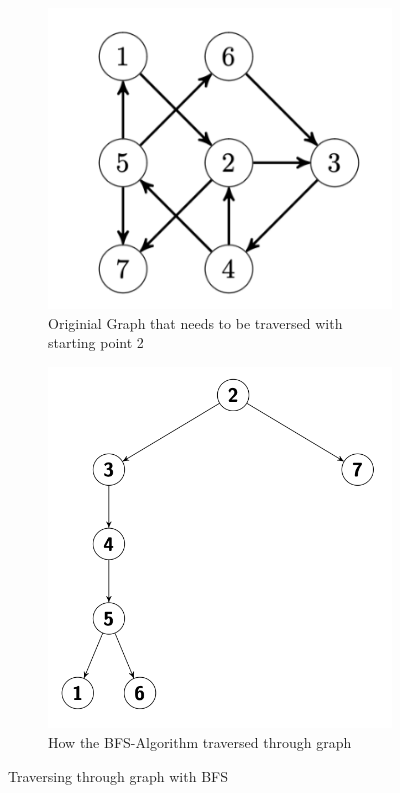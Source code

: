 \documentclass[a4paper]{article}
\begin{document}
    \begin{figure}[h]
    \begin{subfigure}{0.4\textwidth}
        \centering
        \includegraphics[scale = 0.4, width=\textwidth]{Pictures/BFS-StartGraph.png}
        \caption{Originial Graph that needs to be traversed with starting point 2}
        \label{fig:BFS-Start}
    \end{subfigure}
    \hfill
    \begin{subfigure}{0.35\textwidth}
        \centering
        \includegraphics[scale= 0.4,  width=\textwidth]{Pictures/BFS-EndGraph.png}
         \caption{How the BFS-Algorithm traversed through graph}
        \label{fig:DFS-End}
    \end{subfigure}
\caption{Traversing through graph with BFS}
\label{fig:BFS-Veranschaulichung}
\end{figure}
\end{document}
